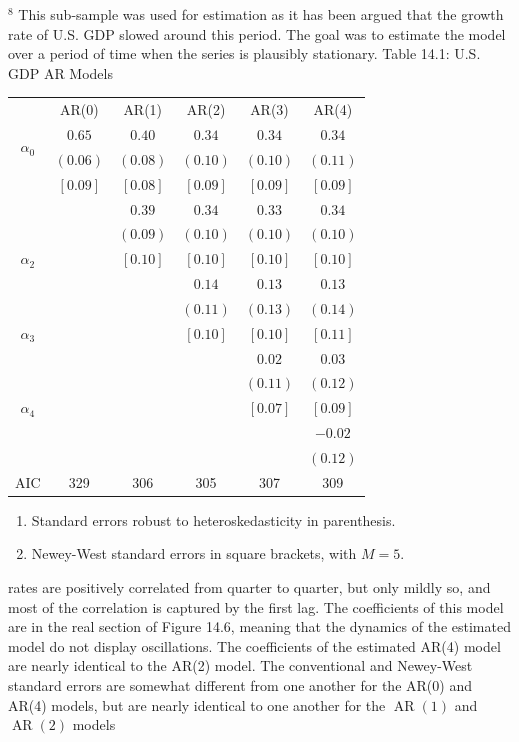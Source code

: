 \documentclass[10pt]{article}
\begin{document}
${ }^{8}$ This sub-sample was used for estimation as it has been argued that the growth rate of U.S. GDP slowed around this period. The goal was to estimate the model over a period of time when the series is plausibly stationary. Table 14.1: U.S. GDP AR Models

\begin{tabular}{cccccc}
\hline\hline
\multirow{4}{*}{$\alpha_{0}$} & AR(0) & AR(1) & AR(2) & AR(3) & AR(4) \\
\cline { 2 - 6 }
 & $0.65$ & $0.40$ & $0.34$ & $0.34$ & $0.34$ \\
 & $(0.06)$ & $(0.08)$ & $(0.10)$ & $(0.10)$ & $(0.11)$ \\
 & $[0.09]$ & $[0.08]$ & $[0.09]$ & $[0.09]$ & $[0.09]$ \\
 &  & $0.39$ & $0.34$ & $0.33$ & $0.34$ \\
 &  & $(0.09)$ & $(0.10)$ & $(0.10)$ & $(0.10)$ \\
$\alpha_{2}$ &  & $[0.10]$ & $[0.10]$ & $[0.10]$ & $[0.10]$ \\
 &  &  & $0.14$ & $0.13$ & $0.13$ \\
 &  &  & $(0.11)$ & $(0.13)$ & $(0.14)$ \\
$\alpha_{3}$ &  &  & $[0.10]$ & $[0.10]$ & $[0.11]$ \\
 &  &  &  & $0.02$ & $0.03$ \\
 &  &  &  & $(0.11)$ & $(0.12)$ \\
$\alpha_{4}$ &  &  &  & $[0.07]$ & $[0.09]$ \\
 &  &  &  &  & $-0.02$ \\
 &  &  &  &  & $(0.12)$ \\
AIC & 329 & 306 & 305 & 307 & 309 \\
\hline
\end{tabular}

\begin{enumerate}
  \item Standard errors robust to heteroskedasticity in parenthesis.

  \item Newey-West standard errors in square brackets, with $M=5$.

\end{enumerate}
rates are positively correlated from quarter to quarter, but only mildly so, and most of the correlation is captured by the first lag. The coefficients of this model are in the real section of Figure 14.6, meaning that the dynamics of the estimated model do not display oscillations. The coefficients of the estimated AR(4) model are nearly identical to the AR(2) model. The conventional and Newey-West standard errors are somewhat different from one another for the AR(0) and AR(4) models, but are nearly identical to one another for the $\operatorname{AR}(1)$ and $\operatorname{AR}(2)$ models
\end{document}
